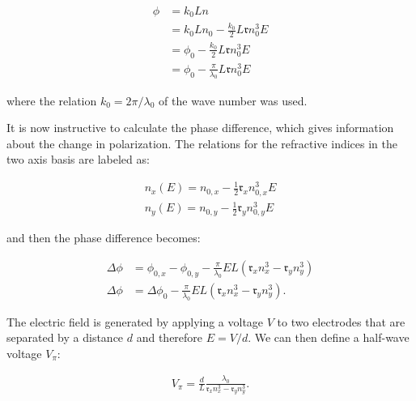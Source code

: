 \begin{align}
	\phi & = k_0 L n \\
		 & = k_0 L n_0 - \frac{k_0}{2} L \mathfrak{r} n_0^3 E \\
		 & = \phi_0 - \frac{k_0}{2} L \mathfrak{r} n_0^3 E \\
		 & = \phi_0 - \frac{\pi}{\lambda_0} L \mathfrak{r} n_0^3 E
\end{align}

where the relation $k_0 = 2 \pi / \lambda_0$ of the wave number was used.

It is now instructive to calculate the phase difference, which gives information about the change in polarization. The relations for the refractive indices in the two axis basis are labeled as:

\begin{align}
	n_x(E) = n_{0,x} - \frac{1}{2} \mathfrak{r}_x n_{0,x}^3 E \\
	n_y(E) = n_{0,y} - \frac{1}{2} \mathfrak{r}_y n_{0,y}^3 E
\end{align}

and then the phase difference becomes:

\begin{align}
	\Delta \phi & = \phi_{0,x} - \phi_{0,y} - \frac{\pi}{\lambda_0} E L \left(\mathfrak{r}_x n_x^3 - \mathfrak{r}_y n_y^3\right) \\
	\Delta \phi & = \Delta \phi_{0} - \frac{\pi}{\lambda_0} E L \left(\mathfrak{r}_x n_x^3 - \mathfrak{r}_y n_y^3\right) .
\end{align}

\begin{figure}[h]
\end{figure}

The electric field is generated by applying a voltage $V$ to two electrodes that are separated by a distance $d$ and therefore $E = V/d$. We can then define a half-wave voltage $V_\pi$:

\begin{align}
	V_\pi = \frac{d}{L} \frac{\lambda_0}{\mathfrak{r}_x n_x^3 - \mathfrak{r}_y n_y^3}.
\end{align}

